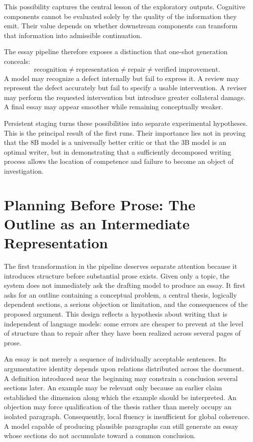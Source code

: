 \documentclass[11pt]{article}
\begin{document}
This possibility captures the central lesson of the exploratory outputs. Cognitive components cannot be evaluated solely by the quality of the information they emit. Their value depends on whether downstream components can transform that information into admissible continuation.

The essay pipeline therefore exposes a distinction that one-shot generation conceals:
\[
    \text{recognition}
    \neq
    \text{representation}
    \neq
    \text{repair}
    \neq
    \text{verified improvement}.
\]
A model may recognize a defect internally but fail to express it. A review may represent the defect accurately but fail to specify a usable intervention. A reviser may perform the requested intervention but introduce greater collateral damage. A final essay may appear smoother while remaining conceptually weaker.

Persistent staging turns these possibilities into separate experimental hypotheses. This is the principal result of the first runs. Their importance lies not in proving that the 8B model is a universally better critic or that the 3B model is an optimal writer, but in demonstrating that a sufficiently decomposed writing process allows the location of competence and failure to become an object of investigation.

\section{Planning Before Prose: The Outline as an Intermediate Representation}

The first transformation in the pipeline deserves separate attention because it introduces structure before substantial prose exists. Given only a topic, the system does not immediately ask the drafting model to produce an essay. It first asks for an outline containing a conceptual problem, a central thesis, logically dependent sections, a serious objection or limitation, and the consequences of the proposed argument. This design reflects a hypothesis about writing that is independent of language models: some errors are cheaper to prevent at the level of structure than to repair after they have been realized across several pages of prose.

An essay is not merely a sequence of individually acceptable sentences. Its argumentative identity depends upon relations distributed across the document. A definition introduced near the beginning may constrain a conclusion several sections later. An example may be relevant only because an earlier claim established the dimension along which the example should be interpreted. An objection may force qualification of the thesis rather than merely occupy an isolated paragraph. Consequently, local fluency is insufficient for global coherence. A model capable of producing plausible paragraphs can still generate an essay whose sections do not accumulate toward a common conclusion.
\end{document}
